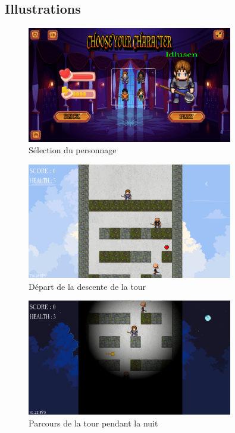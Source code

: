 \documentclass[a4paper,12pt]{article}
\begin{document}
\begin{appendices}
\section{Illustrations}
%
\begin{figure}[H]
	\centering
	\includegraphics[width=0.8\textwidth]{img/ecran_selection.png}
	\caption{Sélection du personnage}
	\label{selection_personnage}
\end{figure}
\begin{figure}[H]
	\centering
	\includegraphics[width=0.8\textwidth]{img/ecran_debut.png}
	\caption{Départ de la descente de la tour}
	\label{départ}
\end{figure}
\newpage
\begin{figure}[H]
	\centering
	\includegraphics[width=0.8\textwidth]{img/ecran_nuit.png}
	\caption{Parcours de la tour pendant la nuit}
	\label{tour_nuit}
\end{figure}

\end{appendices}
\end{document}
